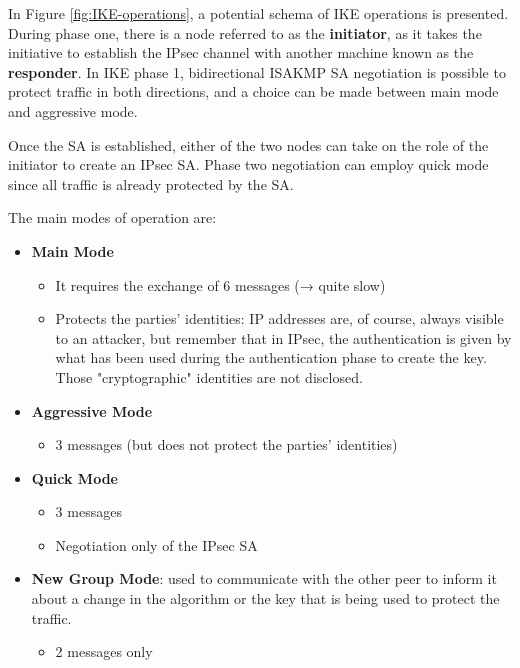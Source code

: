 In Figure \ref{fig:IKE-operations}, a potential schema of IKE operations is presented. During phase one, there is a node referred to as the \textbf{initiator}, as it takes the initiative to establish the IPsec channel with another machine known as the \textbf{responder}. In IKE phase 1, bidirectional ISAKMP SA negotiation is possible to protect traffic in both directions, and a choice can be made between main mode and aggressive mode.

Once the SA is established, either of the two nodes can take on the role of the initiator to create an IPsec SA. Phase two negotiation can employ quick mode since all traffic is already protected by the SA.

The main modes of operation are:

\begin{itemize}
    \item \textbf{Main Mode}
          \begin{itemize}
              \item It requires the exchange of 6 messages (→ quite slow)
              \item Protects the parties' identities: IP addresses are, of course, always visible to an attacker, but remember that in IPsec, the authentication is given by what has been used during the authentication phase to create the key. Those "cryptographic" identities are not disclosed.
          \end{itemize}

    \item \textbf{Aggressive Mode}
          \begin{itemize}
              \item 3 messages (but does not protect the parties' identities)
          \end{itemize}

    \item \textbf{Quick Mode}
          \begin{itemize}
              \item 3 messages
              \item Negotiation only of the IPsec SA
          \end{itemize}

    \item \textbf{New Group Mode}: used to communicate with the other peer to inform it about a change in the algorithm or the key that is being used to protect the traffic.
          \begin{itemize}
              \item 2 messages only
          \end{itemize}
\end{itemize}

